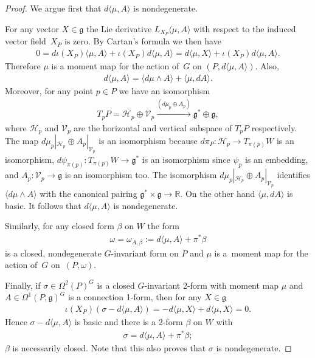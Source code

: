 \documentclass[pdftex]{sigma}
\numberwithin{equation}{section}
\begin{document}
\begin{proof}
  We argue f\/irst that $d \langle \mu, A\rangle$ is nondegenerate.

  For any vector $X\in {\mathfrak g}$ the Lie derivative $L_{X_P} \langle \mu,
  A\rangle$ with respect to the induced vector f\/ield~$X_P$ is zero.
  By Cartan's formula we then have
\begin{gather*}
0= d \iota(X_P)\langle  \mu, A\rangle
   +  \iota(X_P)d \langle  \mu, A\rangle =
   d \langle \mu, X\rangle + \iota(X_P)d \langle  \mu, A\rangle.
\end{gather*}
Therefore $\mu$ is a moment map for the action of~$G$
on $(P, d \langle \mu, A\rangle)$.  Also,
\begin{gather*}
d\langle \mu, A\rangle = \langle d\mu\wedge A\rangle + \langle \mu,
dA\rangle.
\end{gather*}
Moreover, for any point $p\in P$
we have an isomorphism
\begin{gather*}
T_pP ={\mathcal H}_p \oplus {\mathcal V}_p \xrightarrow{(d\mu_p\oplus A_p)} {\mathfrak g}^* \oplus {\mathfrak g},
\end{gather*}
where ${\mathcal H}_p$ and ${\mathcal V}_p$ are the horizontal and vertical subspace
of $T_pP$ respectively.
The map $d\mu_p|_{{\mathcal H}_p} \oplus
A_p|_{{\mathcal V}_p}$ is an isomorphism because $d\pi_P\colon {\mathcal H}_p \to
T_{\pi(p)}W$ is an isomorphism, $d\psi_{\pi(p)}\colon  T_{\pi(p)}W \to
{\mathfrak g}^*$ is an isomorphism since $\psi_p$ is an embedding,
and $A_p\colon {\mathcal V}_p\to {\mathfrak g}$ is an isomorphism too.  The isomorphism
$d\mu_p|_{{\mathcal H}_p} \oplus A_p|_{{\mathcal V}_p}$ identif\/ies $ \langle
d\mu\wedge A\rangle$ with the canonical pairing ${\mathfrak g}^*\times {\mathfrak g}\to
{\mathbb R}$. On the other hand $\langle \mu, dA\rangle$ is basic.  It follows
that $d\langle \mu, A\rangle $ is nondegenerate.

Similarly, for any closed form $\beta$ on $W$ the form
\begin{gather*}
\omega = \omega_{A,\beta}:= d\langle \mu, A\rangle +\pi^* \beta
\end{gather*}
is a closed, nondegenerate $G$-invariant form on $P$ and $\mu$ is a~moment map for the action of~$G$ on~$(P,\omega)$.

Finally, if $\sigma\in \Omega^2(P)^G$ is a closed $G$-invariant 2-form
with moment map $\mu$ and $A\in \Omega^1(P,{\mathfrak g})^G$ is a connection
1-form, then for any $X\in {\mathfrak g}$
\begin{gather*}
\iota(X_P)(\sigma - d\langle \mu, A\rangle) = -d \langle \mu, X\rangle
 + d \langle \mu, X\rangle = 0.
\end{gather*}
Hence $\sigma - d\langle \mu, A\rangle$ is basic and there is a 2-form
$\beta$ on $W$ with
\begin{gather*}
\sigma = d\langle \mu, A\rangle  + \pi^*\beta;
\end{gather*}
$\beta$ is necessarily closed.  Note that this also proves that $\sigma$ is nondegenerate.
\end{proof}
\end{document}
